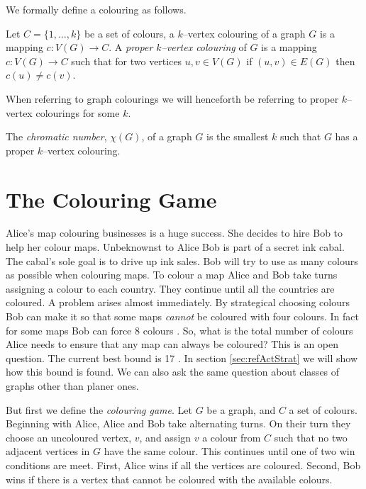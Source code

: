 We formally define a colouring as follows.
\begin{definition}
Let $C=\{1,\dots,k\}$ be a set of colours, a $k$--vertex colouring of a graph $G$ is a mapping $c\colon V(G) \to C$. A \textit{proper $k$--vertex colouring} of $G$ is a mapping $c\colon V(G) \to C$ such that for two vertices $u,v\in V(G)$ if $(u,v)\in E(G)$ then $c(u)\neq c(v)$. 
\end{definition}
When referring to graph colourings we will henceforth be referring to proper $k$--vertex colourings for some $k$. 
\begin{definition}
The \textit{chromatic number}, $\chi(G)$, of a graph $G$ is the smallest $k$ such that $G$ has a proper $k$--vertex colouring.
\end{definition} 

\section{The Colouring Game} \label{sec:colouring_game}
Alice's map colouring businesses is a huge success. She decides to hire Bob to help her colour maps. Unbeknownst to Alice Bob is part of a secret ink cabal. The cabal's sole goal is to drive up ink sales. Bob will try to use as many colours as possible when colouring maps. To colour a map Alice and Bob take turns assigning a colour to each country. They continue until all the countries are coloured. A problem arises almost immediately. By strategical choosing colours Bob can make it so that some maps \textit{cannot} be coloured with four colours. In fact for some maps Bob can force 8 colours \cite{kierstead1994planar}. So, what is the total number of colours Alice needs to ensure that any map can always be coloured? This is an open question. The current best bound is 17 \cite{Zhu2008}. In section \ref{sec:refActStrat} we will show how this bound is found. We can also ask the same question about classes of graphs other than planer ones. 

But first we define the \textit{colouring game}. Let $G$ be a graph, and $C$ a set of colours. Beginning with Alice, Alice and Bob take alternating turns. On their turn they choose an uncoloured vertex, $v$, and assign $v$ a colour from $C$ such that no two adjacent vertices in $G$ have the same colour. This continues until one of two win conditions are meet. First, Alice wins if all the vertices are coloured. Second, Bob wins if there is a vertex that cannot be coloured with the available colours.

